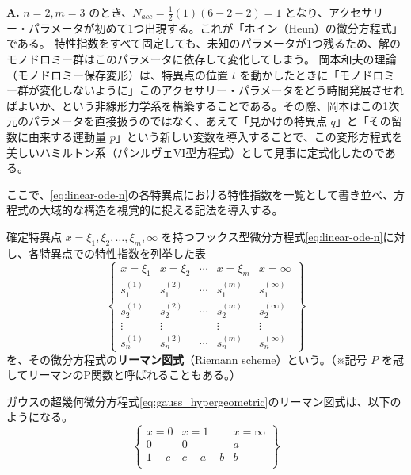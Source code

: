 \begin{Q}[【核心】特異点を1つ増やして4つ（$m=3$）にした場合、何が起きるのか？また、それがパンルヴェ方程式とどう繋がるのか？]
\textbf{A.} $n=2, m=3$ のとき、$N_{acc} = \frac{1}{2}(1)(6 - 2 - 2) = 1$ となり、アクセサリー・パラメータが初めて1つ出現する。これが「ホイン（Heun）の微分方程式」である。
特性指数をすべて固定しても、未知のパラメータが1つ残るため、解のモノドロミー群はこのパラメータに依存して変化してしまう。
岡本和夫の理論（モノドロミー保存変形）は、特異点の位置 $t$ を動かしたときに「モノドロミー群が変化しないように」このアクセサリー・パラメータをどう時間発展させればよいか、という非線形力学系を構築することである。その際、岡本はこの1次元のパラメータを直接扱うのではなく、あえて「見かけの特異点 $q$」と「その留数に由来する運動量 $p$」という新しい変数を導入することで、この変形方程式を美しいハミルトン系（パンルヴェVI型方程式）として見事に定式化したのである。
\end{Q}
ここで、\eqref{eq:linear-ode-n}の各特異点における特性指数を一覧として書き並べ、方程式の大域的な構造を視覚的に捉える記法を導入する。

\begin{definition}[リーマン図式]
    確定特異点 $x = \xi_1, \xi_2, \dots, \xi_m, \infty$ を持つフックス型微分方程式\eqref{eq:linear-ode-n}に対し、各特異点での特性指数を列挙した表
    \[
    \left\{
    \begin{matrix}
        x = \xi_1 & x = \xi_2 & \cdots & x = \xi_m & x = \infty \\
        s_1^{(1)} & s_1^{(2)} & \cdots & s_1^{(m)} & s_1^{(\infty)} \\
        s_2^{(1)} & s_2^{(2)} & \cdots & s_2^{(m)} & s_2^{(\infty)} \\
        \vdots    & \vdots    &        & \vdots    & \vdots \\
        s_n^{(1)} & s_n^{(2)} & \cdots & s_n^{(m)} & s_n^{(\infty)}
    \end{matrix}
    \right\}
    \]
    を、その微分方程式の\textbf{リーマン図式}（Riemann scheme）という。（※記号 $P$ を冠してリーマンのP関数と呼ばれることもある。）
\end{definition}

\begin{example}
    ガウスの超幾何微分方程式\eqref{eq:gauss_hypergeometric}のリーマン図式は、以下のようになる。
    \[
    \left\{
    \begin{matrix}
        x = 0 & x = 1 & x = \infty \\
        0 & 0 & a \\
        1-c & c-a-b & b \\
    \end{matrix}
    \right\}
    \]
\end{example}

